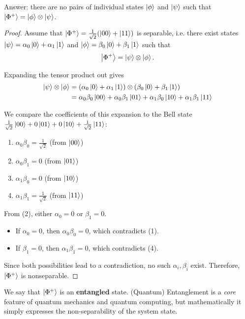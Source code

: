 Answer: there are no pairs of individual states $\ket{\phi}$ and $\ket{\psi}$ such that $\ket{\Phi^+} = \ket{\phi} \otimes \ket{\psi}$.
\begin{proof}
Assume that $\ket{\Phi^+} = \frac{1}{\sqrt{2}}(\ket{00} + \ket{11})$ is separable, i.e. there exist states $\ket{\psi} = \alpha_0\ket{0} + \alpha_1\ket{1}$ and $\ket{\phi} = \beta_0\ket{0} + \beta_1\ket{1}$ such that $$\ket{\Phi^+} = \ket{\psi} \otimes \ket{\phi}.$$

Expanding the tensor product out gives
\begin{align*}
\ket{\psi} \otimes \ket{\phi} &= (\alpha_0\ket{0} + \alpha_1\ket{1}) \otimes (\beta_0\ket{0} + \beta_1\ket{1}) \\
&= \alpha_0\beta_0\ket{00} + \alpha_0\beta_1\ket{01} + \alpha_1\beta_0\ket{10} + \alpha_1\beta_1\ket{11}
\end{align*}

We compare the coefficients of this expansion to the Bell state $\frac{1}{\sqrt{2}}\ket{00} + 0\ket{01} + 0\ket{10} + \frac{1}{\sqrt{2}}\ket{11}$:
\begin{enumerate}
    \item $\alpha_0\beta_0 = \frac{1}{\sqrt{2}}$ (from $\ket{00}$)
    \item $\alpha_0\beta_1 = 0$ (from $\ket{01}$)
    \item $\alpha_1\beta_0 = 0$ (from $\ket{10}$)
    \item $\alpha_1\beta_1 = \frac{1}{\sqrt{2}}$ (from $\ket{11}$)
\end{enumerate}

From (2), either $\alpha_0 = 0$ or $\beta_1 = 0$.
\begin{itemize}
    \item If $\alpha_0 = 0$, then $\alpha_0\beta_0 = 0$, which contradicts (1).
    \item If $\beta_1 = 0$, then $\alpha_1\beta_1 = 0$, which contradicts (4).
\end{itemize}

Since both possibilities lead to a contradiction, no such $\alpha_i, \beta_i$ exist. Therefore, $\ket{\Phi^+}$ is nonseparable.
\end{proof}

We say that $\ket{\Phi^+}$ is an \textbf{entangled} state. (Quantum) Entanglement is a \textit{core} feature of quantum mechanics and quantum computing, but mathematically it simply expresses the non-separability of the system state.

